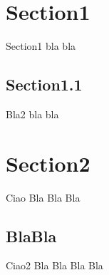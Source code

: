 
\section{Section1}
\begin{frame}{Section1}
  bla bla
\end{frame}

\subsection{Section1.1}
\begin{frame}{Bla2}
  bla bla
\end{frame}

\section{Section2}

\begin{frame}{Ciao}
Bla Bla Bla
\end{frame}

\subsection{BlaBla}
\begin{frame}{Ciao2}
Bla Bla Bla Bla ~\cite{delBuono:1641943}
\end{frame}
